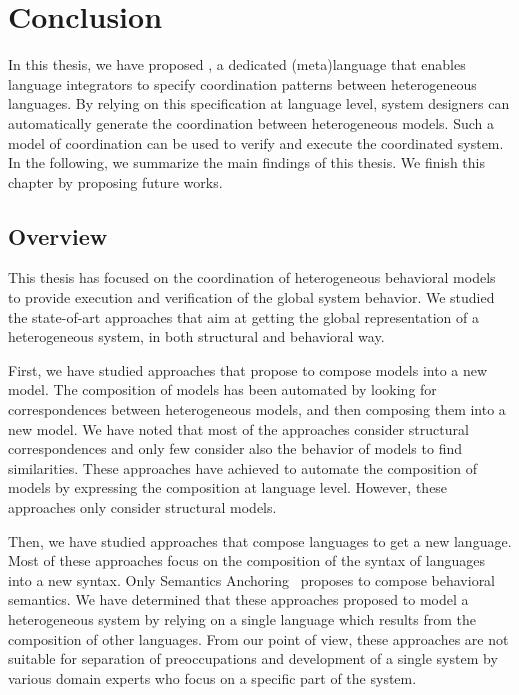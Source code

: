 \chapter{Conclusion}
\label{ch:conclusions}
In this thesis, we have proposed \bcool, a dedicated (meta)language that enables language integrators to specify coordination patterns between heterogeneous languages. By relying on this specification at language level, system designers can automatically generate the coordination between heterogeneous models. Such a model of coordination can be used to verify and execute the coordinated system. In the following, we summarize the main findings of this thesis. We finish this chapter by proposing future works. 

\section{Overview}
	
This thesis has focused on the coordination of heterogeneous behavioral models to provide execution and verification of the global system behavior. We studied the state-of-art approaches that aim at getting the global representation of a heterogeneous system, in both structural and behavioral way. 

First, we have studied approaches that propose to compose models into a new model. The composition of models has been automated by looking for correspondences between heterogeneous models, and then composing them into a new model. We have noted that most of the approaches consider structural correspondences and only few consider also the behavior of models to find similarities. These approaches have achieved to automate the composition of models by expressing the composition at language level. However, these approaches only consider structural models.  

Then, we have studied approaches that compose languages to get a new language. Most of these approaches focus on the composition of the syntax of languages into a new syntax. Only Semantics Anchoring~\cite{semanticsanchoring} proposes to compose behavioral semantics. We have determined that these approaches proposed to model a heterogeneous system by relying on a single language which results from the composition of other languages. From our point of view, these approaches are not suitable for separation of preoccupations and development of a single system by various domain experts who focus on a specific part of the system. 

